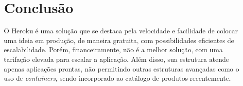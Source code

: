 \section{Conclusão}

O Heroku é uma solução que se destaca pela velocidade e facilidade de colocar uma ideia em produção, de maneira gratuita, com possibilidades eficientes de escalabilidade. Porém, financeiramente, não é a melhor solução, com uma tarifação elevada para escalar a aplicação. Além disso, sua estrutura atende apenas aplicações prontas, não permitindo outras estruturas avançadas como o uso de \textit{containers}, sendo incorporado ao catálogo de produtos recentemente.
